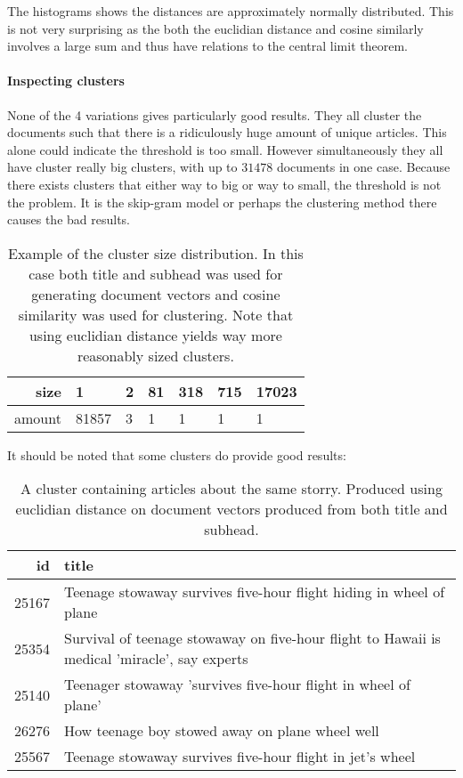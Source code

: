 The histograms shows the distances are approximately normally distributed. This is not very surprising as the both the euclidian distance and cosine similarly involves a large sum and thus have relations to the central limit theorem.

\paragraph{Inspecting clusters}  None of the 4 variations gives particularly good results. They all cluster the documents such that there is a ridiculously huge amount of unique articles. This alone could indicate the threshold is too small. However simultaneously they all have cluster really big clusters, with up to $31478$ documents in one case. Because there exists clusters that either way to big or way to small, the threshold is not the problem. It is the skip-gram model or perhaps the clustering method there causes the bad results.

\begin{table}[H]
\centering
\begin{tabular}{r|l l l l l l }
size & 1 & 2 & 81 & 318 & 715 & 17023 \\ \hline
amount & 81857 & 3 & 1 & 1 & 1 & 1
\end{tabular}
\caption{Example of the cluster size distribution. In this case both title and subhead was used for generating document vectors and cosine similarity was used for clustering. Note that using euclidian distance yields way more reasonably sized clusters.}
\end{table}

It should be noted that some clusters do provide good results:

\begin{table}[H]
\centering
\begin{tabular}{r|p{10cm}}
id & title \\ \hline
 25167 & Teenage stowaway survives five-hour flight hiding in wheel of plane \\
 25354 & Survival of teenage stowaway on five-hour flight to Hawaii is medical 'miracle', say experts \\
 25140 & Teenager stowaway 'survives five-hour flight in wheel of plane' \\
 26276 & How teenage boy stowed away on plane wheel well \\
 25567 & Teenage stowaway survives five-hour flight in jet's wheel
\end{tabular}
\caption{A cluster containing articles about the same storry. Produced using euclidian distance on document vectors produced from both title and subhead.}
\end{table}
 
